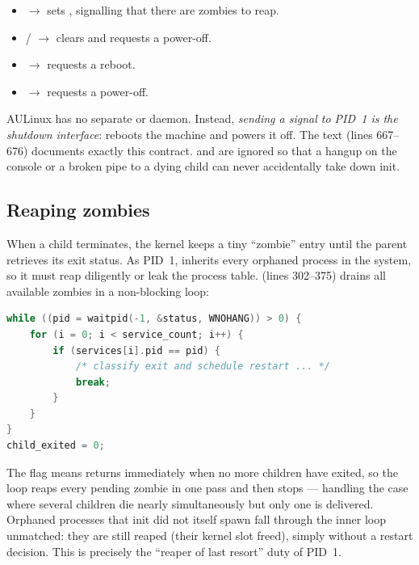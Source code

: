 \begin{itemize}
  \item {} $\rightarrow$ sets , signalling
        that there are zombies to reap.
  \item {} /  $\rightarrow$ clears  and
        requests a power-off.
  \item {} $\rightarrow$ requests a reboot.
  \item {} $\rightarrow$ requests a power-off.
\end{itemize}

\begin{infobox}
AULinux has no separate  or  daemon. Instead,
\emph{sending a signal to PID~1 is the shutdown interface}: 
reboots the machine and  powers it off. The  text
(lines 667--676) documents exactly this contract.  and
 are ignored so that a hangup on the console or a broken pipe to a
dying child can never accidentally take down init.
\end{infobox}

\subsection{Reaping zombies}

When a child terminates, the kernel keeps a tiny ``zombie'' entry until the
parent retrieves its exit status. As PID~1,  inherits every
orphaned process in the system, so it must reap diligently or leak the process
table.  (lines 302--375) drains all available zombies in a
non-blocking loop:

\begin{lstlisting}[language=C, caption={The non-blocking reaping loop}]
while ((pid = waitpid(-1, &status, WNOHANG)) > 0) {
    for (i = 0; i < service_count; i++) {
        if (services[i].pid == pid) {
            /* classify exit and schedule restart ... */
            break;
        }
    }
}
child_exited = 0;
\end{lstlisting}

The  flag means  returns immediately when no more
children have exited, so the  loop reaps every pending zombie in one
pass and then stops --- handling the case where several children die nearly
simultaneously but only one  is delivered. Orphaned processes that
init did not itself spawn fall through the inner loop unmatched: they are still
reaped (their kernel slot freed), simply without a restart decision. This is
precisely the ``reaper of last resort'' duty of PID~1.

